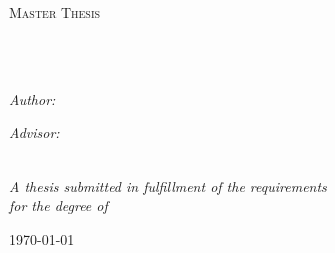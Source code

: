 \documentclass[
12pt, %
english, %
doublespacing, %
headsepline, %
]{MastersDoctoralThesis} %
\author{Ori \textsc{Tal}} %
\begin{document}
\frontmatter %

\pagestyle{plain} %


\begin{titlepage}
\begin{center}

\vspace*{.06\textheight}
{\scshape\LARGE \univname\par}\vspace{0.5cm} %
\textsc{\Large Master Thesis}\\[0.1cm] %

\HRule \\[0.1cm] %
{\huge \bfseries \ttitle\par}\vspace{0.1cm} %
\HRule \\[0.1cm] %
 
\begin{minipage}[t]{0.4\textwidth}
\begin{flushleft} \large
\emph{Author:}\\
\href{http://www.johnsmith.com}{\authorname} %
\end{flushleft}
\end{minipage}
\begin{minipage}[t]{0.4\textwidth}
\begin{flushright} \large
\emph{Advisor:} \\
\href{http://www.jamessmith.com}{\supname} %
\end{flushright}
\end{minipage}\\[1cm]


\large \textit{A thesis submitted in fulfillment of the requirements\\ for the degree of \degreename}\\[0.3cm] %

 
\vfill

{\large \today}\\[4cm] %
 
\vfill
\end{center}
\end{titlepage}
\end{document}
